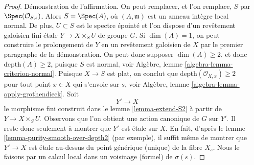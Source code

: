 \begin{proof}
\medskip\noindent
Démonstration de l'affirmation. On peut remplacer, et l'on remplace, $S$ par $\Spec(\mathcal{O}_{S, s})$.
Alors $S = \Spec(A)$, où $(A, \mathfrak m)$ est un anneau intègre local normal.
De plus, $U \subset S$ est le spectre épointé et l'on dispose d'un revêtement
galoisien fini \'etale $Y \to X \times_S U$ de groupe $G$.
Si $\dim(A) = 1$, on peut construire le prolongement de $Y$ en
un revêtement galoisien de $X$ par le premier paragraphe de la démonstration.
On peut donc supposer $\dim(A) \geq 2$, et donc $\text{depth}(A) \geq 2$,
puisque $S$ est normal, voir Algèbre, lemme \ref{algebra-lemma-criterion-normal}.
Puisque $X \to S$ est plat, on conclut que
$\text{depth}(\mathcal{O}_{X, x}) \geq 2$ pour tout point $x \in X$
qui s'envoie sur $s$, voir
Algèbre, lemme \ref{algebra-lemma-apply-grothendieck}.
Soit
$$
Y' \longrightarrow X
$$
le morphisme fini construit dans le lemme \ref{lemma-extend-S2}
à partir de $Y \to X \times_S U$. Observons que l'on obtient une action canonique
de $G$ sur $Y'$. Il reste donc seulement à montrer que $Y'$
est \'etale sur $X$. En fait, d'après le
lemme \ref{lemma-purity-smooth-over-depth2} (par exemple),
il suffit même de montrer que $Y' \to X$ est \'etale au-dessus du
point générique (unique) de la fibre $X_s$. Nous le faisons par
un calcul local dans un voisinage (formel) de $\sigma(s)$.


\end{proof}
